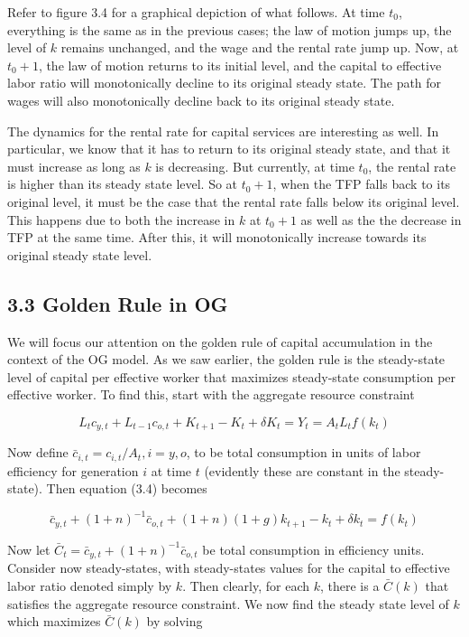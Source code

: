 \documentclass[10pt]{article}
\begin{document}
Refer to figure 3.4 for a graphical depiction of what follows. At time $t_{0}$, everything is the same as in the previous cases; the law of motion jumps up, the level of $k$ remains unchanged, and the wage and the rental rate jump up. Now, at $t_{0}+1$, the law of motion returns to its initial level, and the capital to effective labor ratio will monotonically decline to its original steady state. The path for wages will also monotonically decline back to its original steady state.

The dynamics for the rental rate for capital services are interesting as well. In particular, we know that it has to return to its original steady state, and that it must increase as long as $k$ is decreasing. But currently, at time $t_{0}$, the rental rate is higher than its steady state level. So at $t_{0}+1$, when the TFP falls back to its original level, it must be the case that the rental rate falls below its original level. This happens due to both the increase in $k$ at $t_{0}+1$ as well as the the decrease in TFP at the same time. After this, it will monotonically increase towards its original steady state level.

\subsection*{3.3 Golden Rule in OG}
We will focus our attention on the golden rule of capital accumulation in the context of the OG model. As we saw earlier, the golden rule is the steady-state level of capital per effective worker that maximizes steady-state consumption per effective worker. To find this, start with the aggregate resource constraint


\begin{equation*}
L_{t} c_{y, t}+L_{t-1} c_{o, t}+K_{t+1}-K_{t}+\delta K_{t}=Y_{t}=A_{t} L_{t} f\left(k_{t}\right) \tag{3.4}
\end{equation*}


Now define $\bar{c}_{i, t}=c_{i, t} / A_{t}, i=y, o$, to be total consumption in units of labor efficiency for generation $i$ at time $t$ (evidently these are constant in the steady-state). Then equation (3.4) becomes

$$
\bar{c}_{y, t}+(1+n)^{-1} \bar{c}_{o, t}+(1+n)(1+g) k_{t+1}-k_{t}+\delta k_{t}=f\left(k_{t}\right)
$$

Now let $\bar{C}_{t}=\bar{c}_{y, t}+(1+n)^{-1} \bar{c}_{o, t}$ be total consumption in efficiency units. Consider now steady-states, with steady-states values for the capital to effective labor ratio denoted simply by $k$. Then clearly, for each $k$, there is a $\bar{C}(k)$ that satisfies the aggregate resource constraint. We now find the steady state level of $k$ which maximizes $\bar{C}(k)$ by solving
\end{document}

